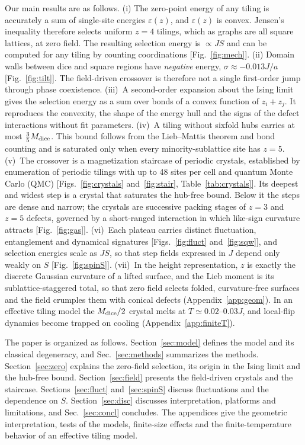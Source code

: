 \documentclass[prb,twocolumn,amsmath,amssymb,floatfix]{revtex4-2}
\newcommand{\Md}{M_{\rm dice}}
\newcommand{\eps}{\varepsilon}
\begin{document}
Our main results are as follows.
(i) The zero-point energy of any tiling is accurately a sum of single-site energies $\eps(z)$, and $\eps(z)$ is convex. Jensen's inequality therefore selects uniform $z=4$ tilings, which as graphs are all square lattices, at zero field. The resulting selection energy is $\propto JS$ and can be computed for any tiling by counting coordinations [Fig.~\ref{fig:mech}].
(ii) Domain walls between dice and square regions have \emph{negative} energy, $\sigma\approx-0.013J/a$ [Fig.~\ref{fig:tilt}]. The field-driven crossover is therefore not a single first-order jump through phase coexistence.
(iii)~A second-order expansion about the Ising limit gives the selection energy as a sum over bonds of a convex function of $z_i+z_j$. It reproduces the convexity, the shape of the energy hull and the signs of the defect interactions without fit parameters.
(iv)~A tiling without sixfold hubs carries at most $\frac35\Md$. This bound follows from the Lieb--Mattis theorem and bond counting and is saturated only when every minority-sublattice site has $z=5$.
(v)~The crossover is a magnetization staircase of periodic crystals, established by enumeration of periodic tilings with up to 48 sites per cell and quantum Monte Carlo (QMC) [Figs.~\ref{fig:crystals} and~\ref{fig:stair}, Table~\ref{tab:crystals}]. Its deepest and widest step is a crystal that saturates the hub-free bound. Below it the steps are dense and narrow; the crystals are successive packing stages of $z=3$ and $z=5$ defects, governed by a short-ranged interaction in which like-sign curvature attracts [Fig.~\ref{fig:gas}].
(vi)~Each plateau carries distinct fluctuation, entanglement and dynamical signatures [Figs.~\ref{fig:fluct} and~\ref{fig:sqw}], and selection energies scale as $JS$, so that step fields expressed in $J$ depend only weakly on $S$ [Fig.~\ref{fig:spinS}].
(vii)~In the height representation, $z$ is exactly the discrete Gaussian curvature of a lifted surface, and the Lieb moment is its sublattice-staggered total, so that zero field selects folded, curvature-free surfaces and the field crumples them with conical defects (Appendix~\ref{app:geom}). In an effective tiling model the $\Md/2$ crystal melts at $T\simeq0.02$--$0.03J$, and local-flip dynamics become trapped on cooling (Appendix~\ref{app:finiteT}).

The paper is organized as follows. Section~\ref{sec:model} defines the model and its classical degeneracy, and Sec.~\ref{sec:methods} summarizes the methods. Section~\ref{sec:zero} explains the zero-field selection, its origin in the Ising limit and the hub-free bound. Section~\ref{sec:field} presents the field-driven crystals and the staircase. Sections~\ref{sec:fluct} and~\ref{sec:spinS} discuss fluctuations and the dependence on $S$. Section~\ref{sec:disc} discusses interpretation, platforms and limitations, and Sec.~\ref{sec:concl} concludes. The appendices give the geometric interpretation, tests of the models, finite-size effects and the finite-temperature behavior of an effective tiling model.
\end{document}

